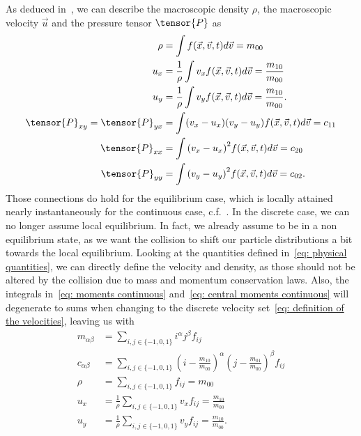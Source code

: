 As deduced in~\cite[pages 23 ff.]{harris2004introduction}, we can describe the macroscopic density $\rho$, the macroscopic velocity $\vec{u}$ and the pressure tensor $\tensor{P}$ as
\begin{equation}
  \label{eq: physical quantities}
  \begin{aligned}
    \rho & = \int f (\vec{x},\vec{v},t) d\vec{v} = m_{00} \\
    u_x
    & = \frac{1}{\rho}\int v_x f(\vec{x},\vec{v},t) d\vec{v} = \frac{ m_{10} }{ m_{00} }\\
    u_y
    & = \frac{1}{\rho}\int v_y f(\vec{x},\vec{v},t) d\vec{v} = \frac{ m_{10} }{ m_{00} }.\\
    \tensor{P}_{xy}=\tensor{P}_{yx}
    & = \int (v_x - u_x)(v_y - u_y) f(\vec{x},\vec{v},t) d\vec{v}
      = c_{11} \\
    \tensor{P}_{xx}
    & = \int {(v_x - u_x)}^2 f(\vec{x},\vec{v},t) d\vec{v}
      = c_{20} \\
    \tensor{P}_{yy}
    & = \int {(v_y - u_y)}^2 f(\vec{x},\vec{v},t) d\vec{v}
      = c_{02} .
  \end{aligned}
\end{equation}
Those connections do hold for the equilibrium case, which is locally attained nearly instantaneously for the continuous case, c.f.~\cite[page 218]{smits2000physical}.
In the discrete case, we can no longer assume local equilibrium.
In fact, we already assume to be in a non equilibrium state, as we want the collision to shift our particle distributions a bit towards the local equilibrium.
Looking at the quantities defined in~\eqref{eq: physical quantities}, we can directly define the velocity and density, as those should not be altered by the collision due to mass and momentum conservation laws.
Also, the integrals in~\eqref{eq: moments continuous} and~\eqref{eq: central moments continuous} will degenerate to sums when changing to the discrete velocity set~\eqref{eq: definition of the velocities}, leaving us with
\begin{align}
  m_{\alpha\beta} &= \sum_{i,j \in \{-1,0,1\}} i^\alpha j^\beta f_{ij}
  \label{eq: moment definition}\\
  c_{\alpha\beta} &= \sum_{i,j \in \{-1,0,1\}} {\left(i - \frac{m_{10}}{m_{00}}\right)}^\alpha {\left(j-\frac{m_{01}}{m_{00}}\right)}^\beta f_{ij}
  \label{eq: central moment definition}\\
  \rho & = \sum_{i,j \in \{-1,0,1\}} f_{ij} = m_{00}
  \label{eq: density definition}\\
  u_x  & = \frac{1}{\rho} \sum_{i,j \in \{-1,0,1\}} v_x f_{ij} = \frac{m_{10}}{m_{00}}
  \label{eq: x velocity definition}\\
  u_y  & = \frac{1}{\rho} \sum_{i,j \in \{-1,0,1\}} v_y f_{ij} = \frac{m_{10}}{m_{00}}.
  \label{eq: y velocity definition}
\end{align}

